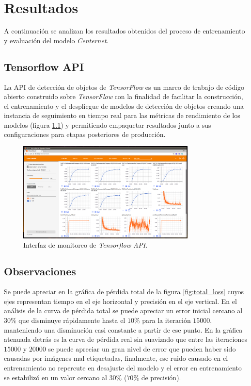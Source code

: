 \documentclass[letter,12pt]{report}
\begin{document}
\chapter{Resultados}\label{resultados}
A continuación se analizan los resultados obtenidos del proceso de
entrenamiento y evaluación del modelo \textit{Centernet}.

\section{Tensorflow API}

La API de detección de objetos de \textit{TensorFlow} es un marco de trabajo de código abierto
construido sobre \textit{TensorFlow} con la finalidad de facilitar la construcción, el
entrenamiento y el despliegue de modelos de detección de objetos creando una instancia de
seguimiento en tiempo real para las métricas de rendimiento de los modelos (figura
\ref{fig:tensorapi}) y permitiendo empaquetar resultados junto a sus configuraciones para
etapas posteriores de producción.

\begin{figure}[ht]
    \centering
    \includegraphics[width=0.8\textwidth]{tensorapi}
    \caption{Interfaz de monitoreo de \textit{Tensorflow API}.}
    \label{fig:tensorapi}
\end{figure}

\section{Observaciones}
Se puede apreciar en la gráfica de pérdida total de la figura \ref{fig:total_loss} cuyos ejes
representan tiempo en el eje horizontal y precisión en el eje vertical. En el análisis de la
curva de pérdida total se puede apreciar un error inicial cercano al $30\%$ que disminuye
rápidamente hasta el $10\%$ para la iteración $15000$, manteniendo una disminución casi
constante a partir de ese punto. En la gráfica atenuada detrás es la curva de pérdida real
sin suavizado que entre las iteraciones $15000$ y $20000$ se puede apreciar un gran nivel de
error que pueden haber sido causadas por imágenes mal etiquetadas, finalmente, ese ruido
causado en el entrenamiento no repercute en desajuste del modelo y el error en entrenamiento
se estabilizó en un valor cercano al $30\%$ ($70\%$ de precisión).
\end{document}

